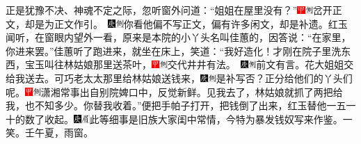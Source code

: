 正是犹豫不决、神魂不定之际，忽听窗外问道：``姐姐在屋里没有？''{\includegraphics[width=3mm]{../Images/00002}\includegraphics[width=3mm]{../Images/00011}\footnotesize \kaishu 岔开正文，却是为正文作引。　\includegraphics[width=3mm]{../Images/00004}\includegraphics[width=3mm]{../Images/00011}\footnotesize \kaishu 你看他偏不写正文，偏有许多闲文，却是补遗。}红玉闻听，在窗眼内望外一看，原来是本院的小丫头名叫佳蕙的，因答说：``在家里，你进来罢。''佳蕙听了跑进来，就坐在床上，笑道：``我好造化！才刚在院子里洗东西，宝玉叫往林姑娘那里送茶叶，{\includegraphics[width=3mm]{../Images/00002}\includegraphics[width=3mm]{../Images/00011}\footnotesize \kaishu 交代井井有法。　\includegraphics[width=3mm]{../Images/00004}\includegraphics[width=3mm]{../Images/00011}\footnotesize \kaishu 前文有言。}花大姐姐交给我送去。可巧老太太那里给林姑娘送钱来，{\includegraphics[width=3mm]{../Images/00004}\includegraphics[width=3mm]{../Images/00011}\footnotesize \kaishu 是补写否？}正分给他们的丫头们呢。{\includegraphics[width=3mm]{../Images/00002}\includegraphics[width=3mm]{../Images/00011}\footnotesize \kaishu 潇湘常事出自别院婢口中，反觉新鲜。}见我去了，林姑娘就抓了两把给我，也不知多少。你替我收着。''便把手帕子打开，把钱倒了出来，红玉替他一五一十的数了收起。{\includegraphics[width=3mm]{../Images/00004}\includegraphics[width=3mm]{../Images/00010}\footnotesize \kaishu 此等细事是旧族大家闺中常情，今特为暴发钱奴写来作鉴。一笑。壬午夏，雨窗。}

